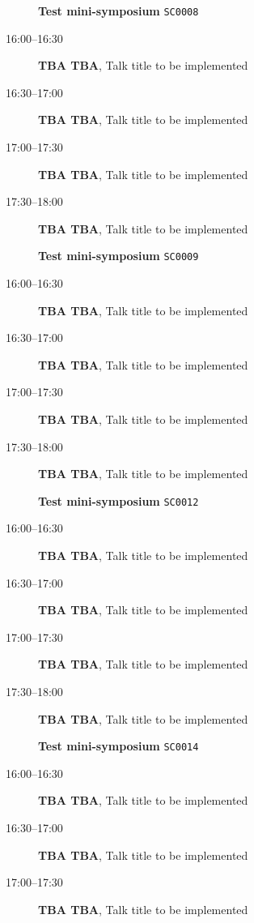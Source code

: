 \documentclass[ILAS2025-program.tex]{subfiles}
\begin{document}
\begin{description}
    \begin{description}
    \item[] \textbf{Test mini-symposium} {\footnotesize\texttt{SC0008}}
    \item[16:00--16:30] \textbf{TBA TBA}, Talk title to be implemented
        \item[16:30--17:00] \textbf{TBA TBA}, Talk title to be implemented
        \item[17:00--17:30] \textbf{TBA TBA}, Talk title to be implemented
        \item[17:30--18:00] \textbf{TBA TBA}, Talk title to be implemented
        \end{description}
    \begin{description}
    \item[] \textbf{Test mini-symposium} {\footnotesize\texttt{SC0009}}
    \item[16:00--16:30] \textbf{TBA TBA}, Talk title to be implemented
        \item[16:30--17:00] \textbf{TBA TBA}, Talk title to be implemented
        \item[17:00--17:30] \textbf{TBA TBA}, Talk title to be implemented
        \item[17:30--18:00] \textbf{TBA TBA}, Talk title to be implemented
        \end{description}
    \begin{description}
    \item[] \textbf{Test mini-symposium} {\footnotesize\texttt{SC0012}}
    \item[16:00--16:30] \textbf{TBA TBA}, Talk title to be implemented
        \item[16:30--17:00] \textbf{TBA TBA}, Talk title to be implemented
        \item[17:00--17:30] \textbf{TBA TBA}, Talk title to be implemented
        \item[17:30--18:00] \textbf{TBA TBA}, Talk title to be implemented
        \end{description}
    \begin{description}
    \item[] \textbf{Test mini-symposium} {\footnotesize\texttt{SC0014}}
    \item[16:00--16:30] \textbf{TBA TBA}, Talk title to be implemented
        \item[16:30--17:00] \textbf{TBA TBA}, Talk title to be implemented
        \item[17:00--17:30] \textbf{TBA TBA}, Talk title to be implemented

\end{description}
\end{description}
\end{document}
